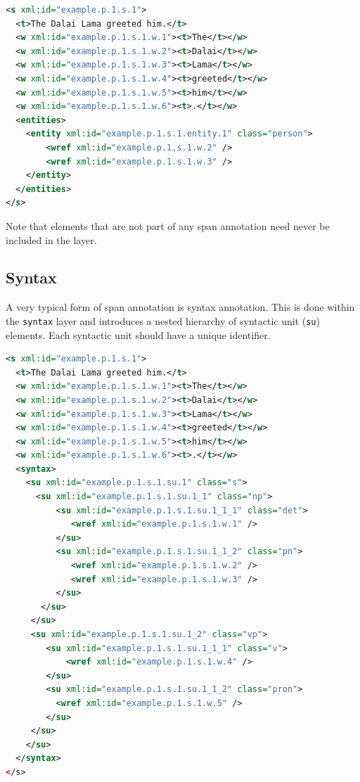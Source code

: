 \documentclass[a4paper,12pt]{report}
\begin{document}
\begin{lstlisting}[language=xml]
<s xml:id="example.p.1.s.1">
  <t>The Dalai Lama greeted him.</t>
  <w xml:id="example.p.1.s.1.w.1"><t>The</t></w>
  <w xml:id="example.p.1.s.1.w.2"><t>Dalai</t></w>
  <w xml:id="example.p.1.s.1.w.3"><t>Lama</t></w>
  <w xml:id="example.p.1.s.1.w.4"><t>greeted</t></w>
  <w xml:id="example.p.1.s.1.w.5"><t>him</t></w>
  <w xml:id="example.p.1.s.1.w.6"><t>.</t></w>
  <entities>
    <entity xml:id="example.p.1.s.1.entity.1" class="person">
        <wref xml:id="example.p.1.s.1.w.2" />
        <wref xml:id="example.p.1.s.1.w.3" />
    </entity>
  </entities>
</s>
\end{lstlisting}

Note that elements that are not part of any span annotation need never be included in the layer.

\subsection{Syntax}

A very typical form of span annotation is syntax annotation. This is done within the \texttt{syntax} layer and introduces a nested hierarchy of syntactic unit (\texttt{su}) elements. Each syntactic unit should have a unique identifier.

\begin{lstlisting}[language=xml]
<s xml:id="example.p.1.s.1">
  <t>The Dalai Lama greeted him.</t>
  <w xml:id="example.p.1.s.1.w.1"><t>The</t></w>
  <w xml:id="example.p.1.s.1.w.2"><t>Dalai</t></w>
  <w xml:id="example.p.1.s.1.w.3"><t>Lama</t></w>
  <w xml:id="example.p.1.s.1.w.4"><t>greeted</t></w>
  <w xml:id="example.p.1.s.1.w.5"><t>him</t></w>
  <w xml:id="example.p.1.s.1.w.6"><t>.</t></w>
  <syntax>
    <su xml:id="example.p.1.s.1.su.1" class="s">     
      <su xml:id="example.p.1.s.1.su.1_1" class="np">
          <su xml:id="example.p.1.s.1.su.1_1_1" class="det">
             <wref xml:id="example.p.1.s.1.w.1" />       
          </su>
          <su xml:id="example.p.1.s.1.su.1_1_2" class="pn">
             <wref xml:id="example.p.1.s.1.w.2" />
             <wref xml:id="example.p.1.s.1.w.3" />        
          </su>         
       </su>
     </su>
     <su xml:id="example.p.1.s.1.su.1_2" class="vp"> 
        <su xml:id="example.p.1.s.1.su.1_1_1" class="v">
            <wref xml:id="example.p.1.s.1.w.4" />       
        </su>
        <su xml:id="example.p.1.s.1.su.1_1_2" class="pron">
          <wref xml:id="example.p.1.s.1.w.5" />       
        </su>
     </su>    
    </su>
  </syntax>
</s>
\end{lstlisting}
\end{document}
